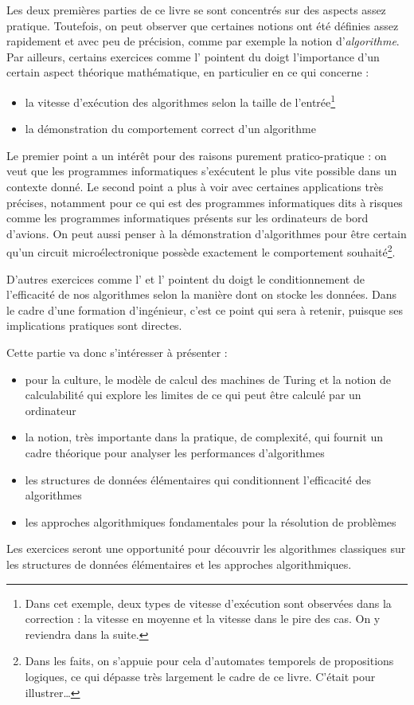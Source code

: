 \documentclass[../../main.tex]{subfiles}
\begin{document}
Les deux premières parties de ce livre se sont concentrés sur des aspects assez pratique. Toutefois, on peut observer que certaines notions ont été définies assez rapidement et avec peu de précision, comme par exemple la notion d'\textit{algorithme}. Par ailleurs, certains exercices comme l' pointent du doigt l'importance d'un certain aspect théorique mathématique, en particulier en ce qui concerne :
\begin{itemize}
	\item la vitesse d'exécution des algorithmes selon la taille de l'entrée\footnote{Dans cet exemple, deux types de vitesse d'exécution sont observées dans la correction : la vitesse en moyenne et la vitesse dans le pire des cas. On y reviendra dans la suite.}
	\item la démonstration du comportement correct d'un algorithme
\end{itemize}
Le premier point a un intérêt pour des raisons purement pratico-pratique : on veut que les programmes informatiques s'exécutent le plus vite possible dans un contexte donné. Le second point a plus à voir avec certaines applications très précises, notamment pour ce qui est des programmes informatiques dits \og à risques \fg comme les programmes informatiques présents sur les ordinateurs de bord d'avions. On peut aussi penser à la démonstration d'algorithmes pour être certain qu'un circuit microélectronique possède exactement le comportement souhaité\footnote{Dans les faits, on s'appuie pour cela d'automates temporels de propositions logiques, ce qui dépasse très largement le cadre de ce livre. C'était pour illustrer\dots}.

D'autres exercices comme l' et l' pointent du doigt le conditionnement de l'efficacité de nos algorithmes selon la manière dont on stocke les données. Dans le cadre d'une formation d'ingénieur, c'est ce point qui sera à retenir, puisque ses implications pratiques sont directes.

Cette partie va donc s'intéresser à présenter :
\begin{itemize}
	\item pour la culture, le modèle de calcul des machines de Turing et la notion de calculabilité qui explore les limites de ce qui peut être calculé par un ordinateur
	\item la notion, très importante dans la pratique, de complexité, qui fournit un cadre théorique pour analyser les performances d'algorithmes
	\item les structures de données élémentaires qui conditionnent l'efficacité des algorithmes
	\item les approches algorithmiques fondamentales pour la résolution de problèmes
\end{itemize}
Les exercices seront une opportunité pour découvrir les algorithmes classiques sur les structures de données élémentaires et les approches algorithmiques.
\end{document}
